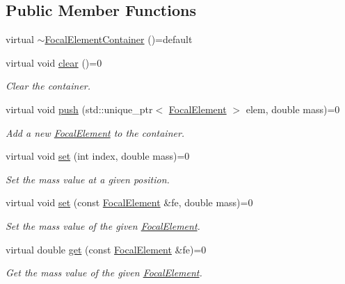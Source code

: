 \subsection*{Public Member Functions}
\begin{DoxyCompactItemize}
\item 
virtual \hyperlink{classFocalElementContainer_a939ab96df66f872bf1600e9536c15aaf}{$\sim$\+Focal\+Element\+Container} ()=default
\item 
virtual void \hyperlink{classFocalElementContainer_a79977845eba147c3d29d8c500dbe593c}{clear} ()=0
\begin{DoxyCompactList}\small\item\em Clear the container. \end{DoxyCompactList}\item 
virtual void \hyperlink{classFocalElementContainer_a951895e83f8ef4ba79fa1c45d2d3c1ac}{push} (std\+::unique\+\_\+ptr$<$ \hyperlink{classFocalElement}{Focal\+Element} $>$ elem, double mass)=0
\begin{DoxyCompactList}\small\item\em Add a new \hyperlink{classFocalElement}{Focal\+Element} to the container. \end{DoxyCompactList}\item 
virtual void \hyperlink{classFocalElementContainer_a37edfcf750dfc72a7f3a92a2ab6bd62e}{set} (int index, double mass)=0
\begin{DoxyCompactList}\small\item\em Set the mass value at a given position. \end{DoxyCompactList}\item 
virtual void \hyperlink{classFocalElementContainer_a444a088fc937650226f2ecdd1db59510}{set} (const \hyperlink{classFocalElement}{Focal\+Element} \&fe, double mass)=0
\begin{DoxyCompactList}\small\item\em Set the mass value of the given \hyperlink{classFocalElement}{Focal\+Element}. \end{DoxyCompactList}\item 
virtual double \hyperlink{classFocalElementContainer_a5ffaa25475069d4868cec5a73ccf314f}{get} (const \hyperlink{classFocalElement}{Focal\+Element} \&fe)=0
\begin{DoxyCompactList}\small\item\em Get the mass value of the given \hyperlink{classFocalElement}{Focal\+Element}. \end{DoxyCompactList}\item 

\end{DoxyCompactItemize}
